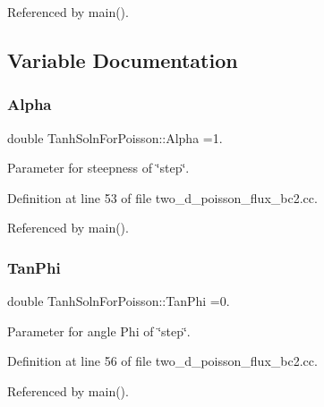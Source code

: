 Referenced by main().



\subsection{Variable Documentation}
\mbox{\label{namespaceTanhSolnForPoisson_ae676ccd186d5df119cce811596d949c1}} 
\subsubsection{\texorpdfstring{Alpha}{Alpha}}
{\footnotesize\ttfamily double Tanh\+Soln\+For\+Poisson\+::\+Alpha =1.}



Parameter for steepness of \char`\"{}step\char`\"{}. 



Definition at line 53 of file two\+\_\+d\+\_\+poisson\+\_\+flux\+\_\+bc2.\+cc.



Referenced by main().

\mbox{\label{namespaceTanhSolnForPoisson_a785ccd00a727125a5138fbbcac173294}} 
\subsubsection{\texorpdfstring{Tan\+Phi}{TanPhi}}
{\footnotesize\ttfamily double Tanh\+Soln\+For\+Poisson\+::\+Tan\+Phi =0.}



Parameter for angle Phi of \char`\"{}step\char`\"{}. 



Definition at line 56 of file two\+\_\+d\+\_\+poisson\+\_\+flux\+\_\+bc2.\+cc.



Referenced by main().

